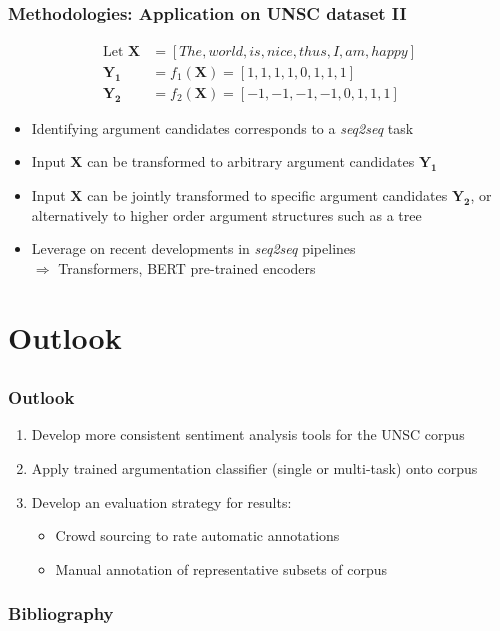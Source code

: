 \documentclass{beamer}
\begin{document}
\subsection{}
\begin{framefont}{\footnotesize}
	\begin{frame}
	\frametitle{Methodologies: Application on UNSC dataset II}
	\begin{align}
	\text{Let } \mathbf{X} &= \left[The, world, is, nice, thus, I, am, happy\right] \\[5pt]
	\mathbf{Y_1} &= f_1(\mathbf{X}) = \left[1, 1, 1, 1, 0, 1, 1, 1\right] \\[5pt]
	\mathbf{Y_2} &= f_2(\mathbf{X}) = \left[-1, -1, -1, -1, 0, 1, 1, 1\right]
	\end{align}
	\begin{itemize}
	    \setlength{\itemsep}{1em}
	    \item Identifying argument candidates corresponds to a \textit{seq2seq} task
	    \item Input $\mathbf{X}$ can be transformed to arbitrary argument candidates $\mathbf{Y_1}$
	    \item Input $\mathbf{X}$ can be jointly transformed to specific argument candidates $\mathbf{Y_2}$, or alternatively to higher order argument structures such as a tree
	    \item Leverage on recent developments in \textit{seq2seq} pipelines \\
	    $\Longrightarrow$ Transformers, BERT pre-trained encoders
	\end{itemize}
	\end{frame}
\end{framefont}

\section{Outlook}
\subsection{}
\begin{framefont}{\footnotesize}
	\begin{frame}
		\frametitle{Outlook}
		\begin{enumerate}
		[square]
			\setlength\itemsep{1.2em}
			\item Develop more consistent sentiment analysis tools for the UNSC corpus
			\item Apply trained argumentation classifier (single or multi-task) onto corpus
			\item Develop an evaluation strategy for results:
			\begin{itemize}
			    \item Crowd sourcing to rate automatic annotations
			    \item Manual annotation of representative subsets of corpus
			\end{itemize}
		\end{enumerate}
	\end{frame}
\end{framefont}

\begin{frame}[allowframebreaks]
	\frametitle{Bibliography}
	\nocite{*}
	\printbibliography[title = {Bibliography}]
\end{frame}
\end{document}
